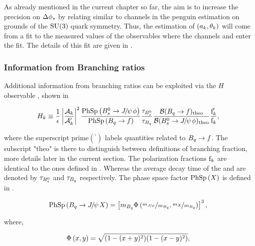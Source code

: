 As already mentioned in the current chapter so far, the aim is to increase the precision on $\Delta{\ensuremath{\phi_{s}}}$
by relating similar to \BsJpsiPhi channels in the penguin estimation on grounds of the $\mathrm{SU}(3)$ quark symmetry.
Thus, the estimation of $(a_k,\theta_k)$ will come from a \chisq fit to the measured values of the observables
 where the channels \BsJpsiKst and \BdJpsiRho enter the fit.
The details of this fit are given in .

\subsubsection{Information from Branching ratios}
Additional information from branching ratios can be exploited via the $H$ observable \cite{Fleischer:1999zi}, shown in 

\begin{equation}
\centering
  \Hobs{k} \equiv   \frac{1}{\epsilon}
            \modulo{\frac{\formFctr{k}}{\formFctr{k}'}}^2
                    \frac{\PhSp{\BsJpsiPhi}} {\PhSp{\Bq\to f}}
                    \frac{\tau_{\Bs}}{\tau_{\Bq}}
                    \frac{\BRof{\Bq\to f}_{\rm theo}}{\BRof{\BsJpsiPhi}_{\rm theo}}
                    \frac{\fP{k}'}{{\fP{k}}},
\label{hobs_def}
\end{equation}

\noindent where the superscript prime$({}^\prime)$ labels quantities related to $B_q\rightarrow f$. The subscript "theo" is there
to distinguish between definitions of branching fraction, more details later in the current section.
The polarization fractions $\text{f}_{k}$ are identical to the ones defined in .
Whereas the average decay time of the \Bs and \Bq are denoted by $\tau_{B^0_s}$ and $\tau_{B_q}$
respectively. The phase space factor ${\rm PhSp}\left( X \right)$ is defined in .

\begin{equation}
\centering
   \PhSp{\BJpsiX}  = \brackets{ \mass{\Bq} \PhSpPhi{ \nicefrac{\mass{\jpsi}}{\mass{\Bq}}, \nicefrac{\mass{X}}{\mass{\Bq}}  } }^3,
\label{phase_space_eq_def}
\end{equation}

\noindent where,

\begin{equation}
\centering
   \PhSpPhi{x,y} = \sqrt{ (1-(x+y)^2)(1-(x-y)^2) },
\label{phase_space_phi_eq_def}
\end{equation}

